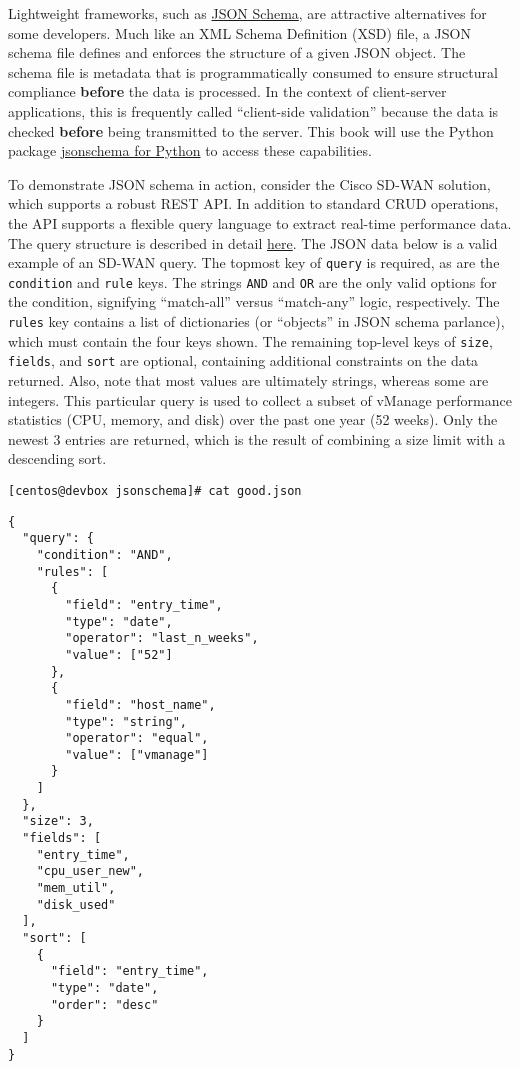 Lightweight frameworks, such as \href{http://json-schema.org/}{JSON Schema},
are attractive alternatives for some developers. Much like an XML Schema
Definition (XSD) file, a JSON schema file defines and enforces the structure
of a given JSON object. The schema file is metadata that is programmatically
consumed to ensure structural compliance \textbf{before} the data is processed.
In the context of client-server applications, this is frequently called
``client-side validation'' because the data is checked \textbf{before}
being transmitted to the server. This book will use the Python package
\href{https://github.com/Julian/jsonschema}{jsonschema for Python} to
access these capabilities.

To demonstrate JSON schema in action, consider the Cisco SD-WAN solution, which
supports a robust REST API\@. In addition to standard CRUD operations, the API
supports a flexible query language to extract real-time performance data. The
query structure is described in detail
\href{https://sdwan-docs.cisco.com/Product_Documentation/Command_Reference/Command_Reference/vManage_REST_APIs/vManage_REST_APIs_Overview/vManage_Simple_Query}{here}.
The JSON data below is a valid example of an SD-WAN query. The topmost key
of \verb|query| is required, as are the \verb|condition| and \verb|rule|
keys. The strings \verb|AND| and \verb|OR| are the only valid options
for the condition, signifying ``match-all'' versus ``match-any'' logic,
respectively. The \verb|rules| key contains a list of dictionaries (or
``objects'' in JSON schema parlance), which must contain the four keys
shown. The remaining top-level keys of \verb|size|, \verb|fields|,
and \verb|sort| are optional, containing additional constraints on
the data returned. Also, note that most values are ultimately strings,
whereas some are integers. This particular query is used to collect
a subset of vManage performance statistics (CPU, memory, and disk) over
the past one year (52 weeks). Only the newest 3 entries are returned,
which is the result of combining a size limit with a descending sort.

\begin{verbatim}
[centos@devbox jsonschema]# cat good.json
\end{verbatim}

\begin{verbatim}
{
  "query": {
    "condition": "AND",
    "rules": [
      {
        "field": "entry_time",
        "type": "date",
        "operator": "last_n_weeks",
        "value": ["52"]
      },
      {
        "field": "host_name",
        "type": "string",
        "operator": "equal",
        "value": ["vmanage"]
      }
    ]
  },
  "size": 3,
  "fields": [
    "entry_time",
    "cpu_user_new",
    "mem_util",
    "disk_used"
  ],
  "sort": [
    {
      "field": "entry_time",
      "type": "date",
      "order": "desc"
    }
  ]
}
\end{verbatim}


